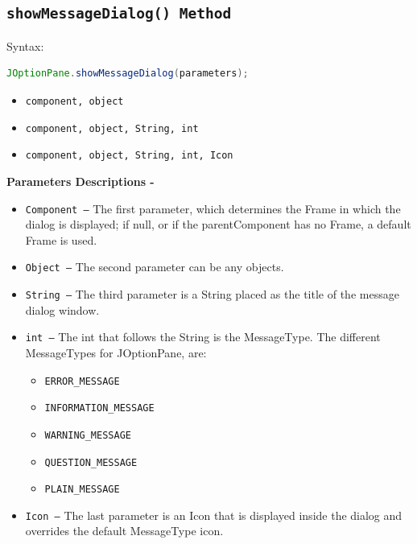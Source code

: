 \subsection{\texttt{showMessageDialog() Method}}
Syntax:\\
\begin{lstlisting}[language=java]
	JOptionPane.showMessageDialog(parameters);
\end{lstlisting}

\begin{itemize}[noitemsep]
	\item \texttt{component, object}
	\item \texttt{component, object, String, int}
	\item \texttt{component, object, String, int, Icon}
\end{itemize}

\textbf{Parameters Descriptions -}
\begin{itemize}[noitemsep]
	\item \texttt{Component –} The first parameter, which determines the Frame in which the dialog is displayed; if null, or if the parentComponent has no Frame, a default Frame is used.
	\item \texttt{Object –} The second parameter can be any objects.
	\item \texttt{String –} The third parameter is a String placed as the title of the message dialog window.
	\item \texttt{int –} The int that follows the String is the MessageType. The different MessageTypes for JOptionPane, are: 
	\begin{itemize}[noitemsep]	
    	\item \texttt{ERROR\_MESSAGE}
    \item \texttt{INFORMATION\_MESSAGE}
    \item \texttt{WARNING\_MESSAGE}
    \item \texttt{QUESTION\_MESSAGE}
    \item \texttt{PLAIN\_MESSAGE}
	\end{itemize}
	\item \texttt{Icon –} The last parameter is an Icon that is displayed inside the dialog and overrides the default MessageType icon.
\end{itemize}


